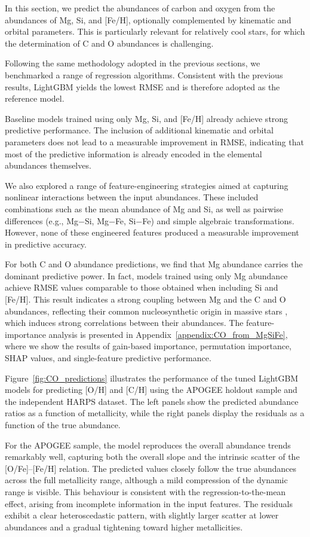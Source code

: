 \documentclass{aa}
\begin{document}
In this section, we predict the abundances of carbon and oxygen from the abundances of Mg, Si, and [Fe/H], optionally complemented by kinematic and orbital parameters. This is particularly relevant for relatively cool stars, for which the determination of C and O abundances is challenging.

Following the same methodology adopted in the previous sections, we benchmarked a range of regression algorithms. Consistent with the previous results, LightGBM yields the lowest RMSE and is therefore adopted as the reference model.

Baseline models trained using only Mg, Si, and [Fe/H] already achieve strong predictive performance. The inclusion of additional kinematic and orbital parameters does not lead to a measurable improvement in RMSE, indicating that most of the predictive information is already encoded in the elemental abundances themselves.

We also explored a range of feature-engineering strategies aimed at capturing nonlinear interactions between the input abundances. These included combinations such as the mean abundance of Mg and Si, as well as pairwise differences (e.g., Mg$-$Si, Mg$-$Fe, Si$-$Fe) and simple algebraic transformations. However, none of these engineered features produced a measurable improvement in predictive accuracy.

For both C and O abundance predictions, we find that Mg abundance carries the dominant predictive power. In fact, models trained using only Mg abundance achieve RMSE values comparable to those obtained when including Si and [Fe/H]. This result indicates a strong coupling between Mg and the C and O abundances, reflecting their common nucleosynthetic origin in massive stars \citep[e.g.][]{Kobayashi-20},  which induces strong correlations between their abundances. The feature-importance analysis is presented in Appendix~\ref{appendix:CO_from_MgSiFe}, where we show the results of gain-based importance, permutation importance, SHAP values, and single-feature predictive performance.

Figure~\ref{fig:CO_predictions} illustrates the performance of the tuned LightGBM models for predicting [O/H] and [C/H] using the APOGEE holdout sample and the independent HARPS dataset. The left panels show the predicted abundance ratios as a function of metallicity, while the right panels display the residuals as a function of the true abundance.

For the APOGEE sample, the model reproduces the overall abundance trends remarkably well, capturing both the overall slope and the intrinsic scatter of the [O/Fe]--[Fe/H] relation. The predicted values closely follow the true abundances across the full metallicity range, although a mild compression of the dynamic range is visible. This behaviour is consistent with the regression-to-the-mean effect, arising from incomplete information in the input features. The residuals exhibit a clear heteroscedastic pattern, with slightly larger scatter at lower abundances and a gradual tightening toward higher metallicities.
\end{document}
